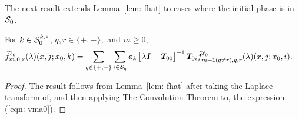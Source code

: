 The next result extends Lemma~\ref{lem: fhat} to cases where the initial phase is in \(\mathcal{S}_{0}\).
\begin{cor}
	For \(k\in\mathcal{S}_0^{k,*}\), \(q,r\in \{+,-\},\) and \(m\geq 0\),
	\begin{align}
		\widehat f_{m,0,r}^{\ell_0}(\lambda)(x,j;x_0,k)  
		&= \sum_{q\in\{+,-\}}\sum_{i\in\mathcal{S}_q}\boldsymbol e_k\begin{bmatrix} \lambda \boldsymbol I - \boldsymbol T_{00} \end{bmatrix}^{-1}\boldsymbol T_{0i}\widehat f_{m+1(q\neq r),q,r}^{\ell_0}(\lambda)(x,j;x_0,i). \label{eqn: vma}
	\end{align}
\end{cor}
\begin{proof}
	The result follows from Lemma~\ref{lem: fhat} after taking the Laplace transform of, and then applying The Convolution Theorem to, the expression (\ref{eqn: vma0}).
\end{proof}


